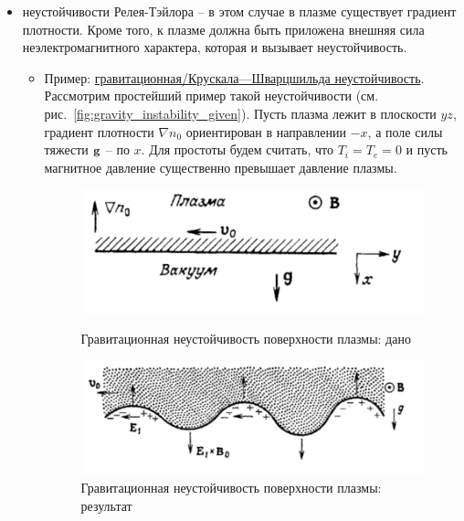 \documentclass[10pt, a4paper]{article}
\begin{document}
\begin{itemize}
\begin{itemize}
	\end{itemize}

	\item неустойчивости Релея-Тэйлора -- в этом случае в плазме существует градиент плотности. Кроме того, к плазме должна быть приложена внешняя сила неэлектромагнитного характера, которая и вызывает неустойчивость. 
	
	\begin{itemize}
		
		\item Пример: \uline{гравитационная/Крускала—Шварцшильда неустойчивость}. Рассмотрим простейший пример такой неустойчивости (см. рис.~\ref{fig:gravity_instability_given}). Пусть плазма лежит в плоскости $yz$, градиент плотности $\nabla n_0$ ориентирован в направлении $-x$, а поле силы тяжести $\vb{g}$ -- по $x$. Для простоты будем считать, что $T_i=T_e=0$ и пусть магнитное давление существенно превышает давление плазмы.
		
		\begin{figure}[ht]
			\begin{center}
				\begin{minipage}[ht]{0.49\linewidth}
					\includegraphics[width=1\linewidth]{gravity_instability_given}
					\caption{Гравитационная неустойчивость поверхности плазмы: дано~\cite{chen}}
					\label{fig:gravity_instability_given}
				\end{minipage}
				\hfill
				\begin{minipage}[ht]{0.49\linewidth}
					\includegraphics[width=1\linewidth]{gravity_instability_result}
					\caption{Гравитационная неустойчивость поверхности плазмы: результат~\cite{chen}}
					\label{fig:gravity_instability_result}
				\end{minipage}
			\end{center}
		\end{figure}
	

\end{itemize}
\end{itemize}
\end{document}
